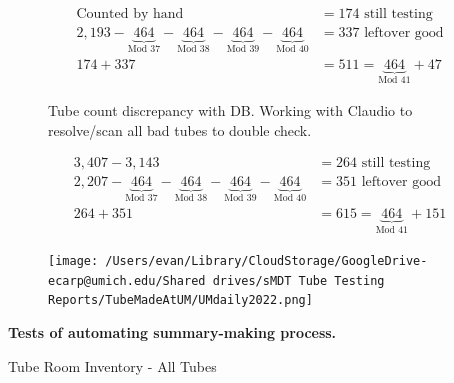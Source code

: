 \documentclass{beamer}
\begin{document}
		\begin{frame}
			\begin{figure}
				\centering
				\scalebox{0.6}{}
			\end{figure}
			\begin{align*}
				\text{Counted by hand}&=174\text{ still testing}\\
				2,193 - \underbrace{464}_\text{Mod 37} - \underbrace{464}_\text{Mod 38} - \underbrace{464}_\text{Mod 39} - \underbrace{464}_\text{Mod 40} &= 337\text{ leftover good}
				\\\hline
				174+337 &=511=\underbrace{464}_\text{Mod 41}+47
			\end{align*}
		\end{frame}
		\begin{frame}
			\begin{figure}
				\centering
				\scalebox{0.6}{}
				\caption*{Tube count discrepancy with DB. Working with Claudio to resolve/scan all bad tubes to double check.}
			\end{figure}
			\begin{align*}
				3,407-3,143&=264\text{ still testing}\\
				2,207 - \underbrace{464}_\text{Mod 37} - \underbrace{464}_\text{Mod 38} - \underbrace{464}_\text{Mod 39} - \underbrace{464}_\text{Mod 40} &= 351\text{ leftover good}
				\\\hline
				264+351 &=615=\underbrace{464}_\text{Mod 41}+151
			\end{align*}
			
		\end{frame}
		\begin{frame}
			\begin{figure}
				\texttt{[image: /Users/evan/Library/CloudStorage/GoogleDrive-ecarp@umich.edu/Shared drives/sMDT Tube Testing Reports/TubeMadeAtUM/UMdaily2022.png]}
			\end{figure}
		\end{frame}
\appendix
	\begin{frame}
		\centering\bf Tests of automating summary-making process.
	\end{frame}
	\begin{frame}{Tube Room Inventory - All Tubes}
		\begin{figure}
			\centering
			\scalebox{0.6}{}
		\end{figure}
	\end{frame}
	
\end{document}
